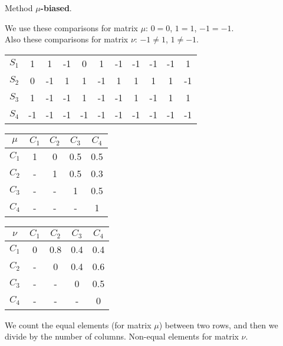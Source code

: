 \documentclass{beamer}
\begin{document}
\begin{frame}
Method \textbf{$\mu$-biased}.

\bigskip
We use these comparisons for matrix $\mu$: $0=0$, $1=1$, $-1=-1$.\\
Also these comparisons for matrix $\nu$: $-1\neq1$, $1\neq-1$.

\begin{center}
\begin{tabular}{c|cccccccccc}
& & & & & & & & & & \\
\hline $S_1$ & 1 & 1 & -1 & 0 & 1 & -1 & -1 & -1 & -1 & 1 \\
$S_2$ & 0 & -1 & 1 & 1 & -1 & 1 & 1 & 1 & 1 & -1 \\
$S_3$ & 1 & -1 & -1 & 1 & -1 & -1 & 1 & -1 & 1 & 1 \\
$S_4$ & -1 & -1 & -1 & -1 & -1 & -1 & -1 & -1 & -1 & -1
\end{tabular}
\end{center}

\begin{center}
\begin{minipage}[b]{0.4\linewidth}
\begin{tabular}{c|cccc}
$\mu$ & $C_1$ & $C_2$ & $C_3$ & $C_4$ \\
\hline $C_1$ & 1 & 0 & 0.5 & 0.5 \\
$C_2$ & - & 1 & 0.5 & 0.3 \\
$C_3$ & - & - & 1 & 0.5 \\
$C_4$ & - & - & - & 1
\end{tabular}
\end{minipage}
\begin{minipage}[b]{0.4\linewidth}
\begin{tabular}{c|cccc}
$\nu$ & $C_1$ & $C_2$ & $C_3$ & $C_4$ \\
\hline $C_1$ & 0 & 0.8 & 0.4 & 0.4 \\
$C_2$ & - & 0 & 0.4 & 0.6 \\
$C_3$ & - & - & 0 & 0.5 \\
$C_4$ & - & - & - & 0
\end{tabular}
\end{minipage}
\end{center}

We count the equal elements (for matrix $\mu$) between two rows, and then we divide by the number of columns.
Non-equal elements for matrix $\nu$.
\end{frame}
\end{document}
